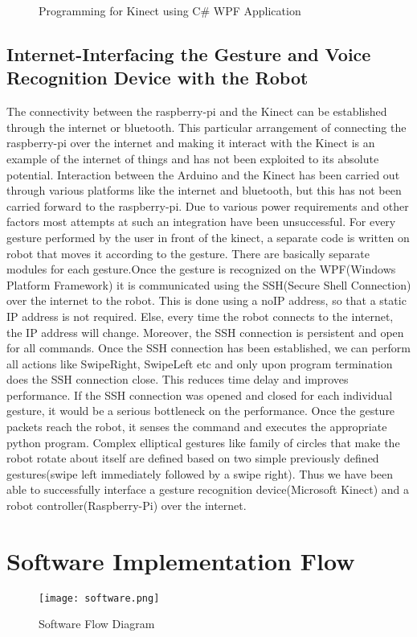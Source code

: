 \begin{figure}[H]
  \centering
  \caption{Programming for Kinect using C\# WPF Application}
  \label{WPF}	
\end{figure}

\subsection{Internet-Interfacing the Gesture and Voice Recognition Device with the Robot}
The connectivity between the raspberry-pi and the Kinect can be established through the internet or bluetooth. This particular arrangement of connecting the raspberry-pi over the internet and making it interact with the Kinect is an example of the internet of things and has not been exploited to its absolute potential. Interaction between the Arduino and the Kinect has been carried out through various platforms like the internet and bluetooth, but this has not been carried forward to the raspberry-pi. Due to various power requirements and other factors most attempts at such an integration have been unsuccessful. 
For every gesture performed by the user in front of the kinect, a separate code is written on robot that moves it according to the gesture. There are basically separate modules for each gesture.Once the gesture is recognized on the WPF(Windows Platform Framework) it is communicated using the SSH(Secure Shell Connection) over the internet to the robot. This is done using a noIP address, so that a static IP address is not required. Else, every time the robot connects to the internet, the IP address will change. Moreover, the SSH connection is persistent and open for all commands. Once the SSH connection has been established, we can perform all actions like SwipeRight, SwipeLeft etc and only upon program termination does the SSH connection close. This reduces time delay and improves performance. If the SSH connection was opened and closed for each individual gesture, it would be a serious bottleneck on the performance. Once the gesture packets reach the robot, it senses the command and executes the appropriate python program. Complex elliptical gestures like family of circles that make the robot rotate about itself are defined based on two simple previously defined gestures(swipe left immediately followed by a swipe right).
Thus we have been able to successfully interface a gesture recognition device(Microsoft Kinect) and a robot controller(Raspberry-Pi) over the internet. 


\section{Software Implementation Flow}

\begin{figure}[H]
  \centering
  \texttt{[image: software.png]}
  \caption{Software Flow Diagram}
  \label{Software Flow}	
\end{figure}

